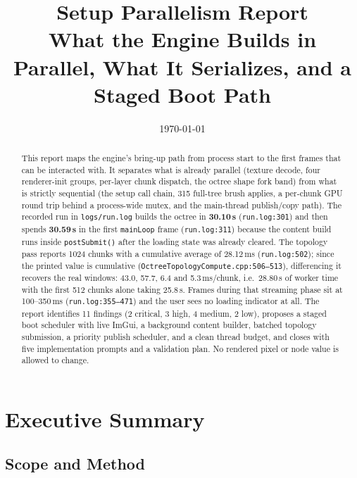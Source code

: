 \documentclass[11pt,a4paper]{article}
\title{Setup Parallelism Report \\
\large What the Engine Builds in Parallel, What It Serializes, and a Staged Boot Path}
\author{}
\date{\today}
\begin{document}
\maketitle

\begin{abstract}
This report maps the engine's bring-up path from process start to the first
frames that can be interacted with. It separates what is already parallel
(texture decode, four renderer-init groups, per-layer chunk dispatch, the
octree shape fork band) from what is strictly sequential (the setup call
chain, 315 full-tree brush applies, a per-chunk GPU round trip behind a
process-wide mutex, and the main-thread publish/copy path). The recorded run in
\texttt{logs/run.log} builds the octree in \textbf{30.10\,s}
(\texttt{run.log:301}) and then spends \textbf{30.59\,s} in the first
\texttt{mainLoop} frame (\texttt{run.log:311}) because the content build runs
inside \texttt{postSubmit()} after the loading state was already cleared. The
topology pass reports 1024 chunks with a cumulative average of 28.12\,ms
(\texttt{run.log:502}); since the printed value is cumulative
(\texttt{OctreeTopologyCompute.cpp:506--513}), differencing it recovers the
real windows: 43.0, 57.7, 6.4 and 5.3\,ms/chunk, i.e.\ 28.80\,s of worker time
with the first 512 chunks alone taking 25.8\,s. Frames during that streaming
phase sit at 100--350\,ms (\texttt{run.log:355--471}) and the user sees no
loading indicator at all. The report identifies 11 findings (2 critical, 3
high, 4 medium, 2 low), proposes a staged boot scheduler with live ImGui, a
background content builder, batched topology submission, a priority publish
scheduler, and a clean thread budget, and closes with five implementation
prompts and a validation plan. No rendered pixel or node value is allowed to
change.
\end{abstract}

\tableofcontents
\newpage

\section{Executive Summary}

\subsection{Scope and Method}
\end{document}
